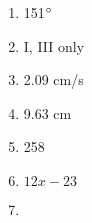 \documentclass[../uilmath.tex]{subfiles}
\begin{document}
\begin{enumerate}[label=\bfseries\arabic*.]
    \item %
    151$\degree$

    \item %
    I, III only 

    \item %
    2.09 cm/s 

    \item %
    9.63 cm 

    \item %
    258

    \item %
    $12x-23$

    \item %
    
\end{enumerate}
\end{document}
